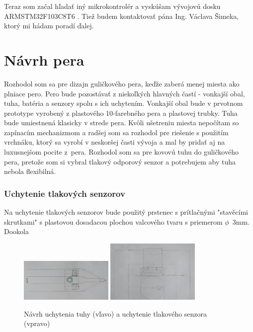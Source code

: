 Teraz som začal hľadať iný mikrokontrolér a vyskúšam vývojovú dosku ARMSTM32F103C8T6 \cite{ArduinoARM}. Tiež budem kontaktovať pána Ing. Václava Šimeka, ktorý mi hádam poradí ďalej.


\section{Návrh pera}

Rozhodol som sa pre dizajn guličkového pera, keďže zaberá menej miesta ako plniace pero. Pero bude pozostávať z niekoľkých hlavných častí - vonkajší obal, tuha, batéria a senzory spolu s ich uchytením. Vonkajší obal bude v prvotnom prototype vyrobený z plastového 10-farebného pera a plastovej trubky. Tuha bude umiestnená klasicky v strede pera. Kvôli ušetreniu miesta nepočítam so zapínacím mechanizmom a radšej som sa rozhodol pre riešenie s použitím vrchnáku, ktorý sa vyrobí v neskoršej časti vývoja a mal by pridať aj na luxusnejšom pocite z~pera. Rozhodol som sa pre kovovú tuhu do guličkového pera, pretože som si vybral tlakový odporový senzor a potrebujem aby tuha nebola flexibilná. 

\subsubsection*{Uchytenie tlakových senzorov}

Na uchytenie tlakových senzorov bude použitý prstenec s prítlačnými "stavěcími skrutkami" s plastovou dosadacou plochou valcového tvaru s priemerom $\phi$~3mm. Dookola 

\begin{figure}[hbt]
	\centering
	\includegraphics[width=0.4\textwidth]{obrazky-figures/umiestnenie_tlakovych_senzorov.png}
	\includegraphics[width=0.4\textwidth]{obrazky-figures/uchytenie.png}
	\caption{Návrh uchytenia tuhy (vľavo) a uchytenie tlakového senzora (vpravo)}
	\label{Uchytenie tuhy}
\end{figure}

